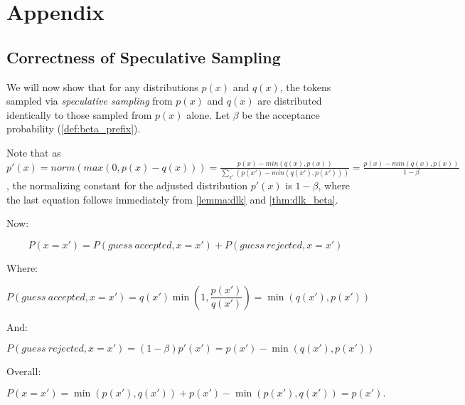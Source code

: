 \documentclass[nohyperref]{article}
\theoremstyle{plain}
\theoremstyle{definition}
\theoremstyle{remark}
\begin{document}





\newpage
\appendix
\onecolumn

\appendix


\section{Appendix}

\subsection{Correctness of Speculative Sampling}
\label{appendix:correctness}

We will now show that for any distributions $p(x)$ and $q(x)$, the tokens sampled via \emph{speculative sampling} from $p(x)$ and $q(x)$ are distributed identically to those sampled from $p(x)$ alone. Let $\beta$ be the acceptance probability (\cref{def:beta_prefix}).

Note that as $p'(x) = norm(max(0, p(x) - q(x))) = \frac{p(x) - min(q(x), p(x))}{\sum_{x'}(p(x') - min(q(x'), p(x')))} = \frac{p(x) - min(q(x), p(x))}{1 - \beta}$, the normalizing constant for the adjusted distribution $p'(x)$ is $1 - \beta$, where the last equation follows immediately from \cref{lemma:dlk} and \cref{thm:dlk_beta}.

Now:

$$
    P(x=x') = P(guess\ accepted, x=x') + P(guess\ rejected, x=x')
$$

Where:

$$
    P(guess\ accepted, x=x') = q(x')\min(1, \frac{p(x')}{q(x')}) = \min(q(x'), p(x'))
$$

And:

$$
    P(guess\ rejected, x=x') = (1 - \beta)p'(x')  = p(x') - \min(q(x'), p(x'))
$$

Overall:

$$
    P(x=x') = \min(p(x'), q(x')) + p(x') - \min(p(x'), q(x')) = p(x').
$$
\end{document}
